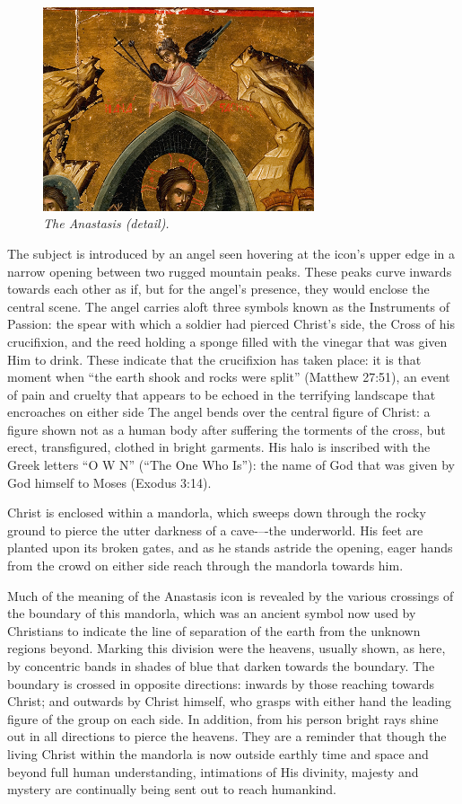 \documentclass[a4paper,12pt]{article}
\begin{document}
\begin{figure}[htbp]
\centering
\includegraphics[width=8cm]{anastasis2.png}
\caption 
{\it The Anastasis (detail).} 
\end{figure}
The subject is introduced by an angel seen hovering at the icon’s
upper edge in a narrow opening between two rugged mountain peaks.
These peaks curve inwards towards each other as if, but for the
angel’s presence, they would enclose the central scene.  The angel
carries aloft three symbols known as the Instruments of Passion: the
spear with which a soldier had pierced Christ’s side, the Cross of his
crucifixion, and the reed holding a sponge filled with the vinegar
that was given Him to drink.  These indicate that the crucifixion has
taken place: it is that moment when ``the earth shook and rocks were
split'' (Matthew 27:51), an event of pain and cruelty that appears to
be echoed in the terrifying landscape that encroaches on either side
The angel bends over the central figure of Christ: a figure shown not
as a human body after suffering the torments of the cross, but erect,
transfigured, clothed in bright garments.  His halo is inscribed with
the Greek letters ``O W N'' (``The One Who Is''): the name of God that
was given by God himself to Moses (Exodus 3:14).

Christ is enclosed within a mandorla, which sweeps down through the
rocky ground to pierce the utter darkness of a cave-–-the underworld.
His feet are planted upon its broken gates, and as he stands astride
the opening, eager hands from the crowd on either side reach through
the mandorla towards him.

Much of the meaning of the Anastasis icon is revealed by the various
crossings of the boundary of this mandorla, which was an ancient
symbol now used by Christians to indicate the line of separation of
the earth from the unknown regions beyond.  Marking this division were
the heavens, usually shown, as here, by concentric bands in shades of
blue that darken towards the boundary.  The boundary is crossed in
opposite directions: inwards by those reaching towards Christ; and
outwards by Christ himself, who grasps with either hand the leading
figure of the group on each side. In addition, from his person bright
rays shine out in all directions to pierce the heavens.  They are a
reminder that though the living Christ within the mandorla is now
outside earthly time and space and beyond full human understanding,
intimations of His divinity, majesty and mystery are continually being
sent out to reach humankind.
\end{document}
